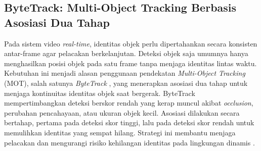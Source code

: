 

\subsection{ByteTrack: Multi-Object Tracking Berbasis Asosiasi Dua Tahap}

Pada sistem video \textit{real-time}, identitas objek perlu dipertahankan
secara konsisten antar-frame agar pelacakan berkelanjutan. Deteksi objek saja
umumnya hanya menghasilkan posisi objek pada satu frame tanpa menjaga
identitas lintas waktu. Kebutuhan ini menjadi alasan penggunaan pendekatan
\textit{Multi-Object Tracking} (MOT), salah satunya \textit{ByteTrack}
\cite{zhang2022bytetrack_eccv}, yang menerapkan asosiasi dua tahap untuk
menjaga kontinuitas identitas objek saat bergerak. ByteTrack mempertimbangkan deteksi berskor rendah yang kerap muncul akibat
\textit{occlusion}, perubahan pencahayaan, atau ukuran objek kecil. Asosiasi
dilakukan secara bertahap, pertama pada deteksi skor tinggi, lalu pada deteksi
skor rendah untuk memulihkan identitas yang sempat hilang. Strategi ini
membantu menjaga pelacakan dan mengurangi risiko kehilangan identitas
pada lingkungan dinamis \cite{zhang2022bytetrack_eccv}.

